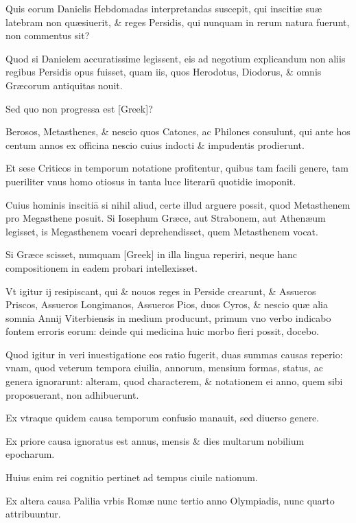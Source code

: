 \begin{parnumbers}

Quis eorum Danielis  Hebdomadas interpretandas suscepit, qui inscitiæ suæ latebram non quæsiuerit, \& reges Persidis, qui nunquam in rerum natura fuerunt, non commentus sit?

Quod si Danielem accuratissime legissent, eis ad negotium explicandum non aliis regibus Persidis opus fuisset, quam iis, quos Herodotus, Diodorus, \& omnis Græcorum antiquitas nouit.

Sed quo non progressa est \textgreek{[Greek]}?

Berosos, Metasthenes, \& nescio quos Catones, ac Philones consulunt, qui ante hos centum annos ex officina nescio cuius indocti \& impudentis prodierunt.

Et sese Criticos in temporum notatione profitentur, quibus tam facili genere, tam pueriliter vnus homo otiosus in tanta luce literarū quotidie imoponit.

 Cuius hominis inscitiā si nihil aliud, certe illud arguere possit, quod Metasthenem pro Megasthene posuit. Si Iosephum Græce, aut Strabonem, aut Athenæum legisset, is Megasthenem vocari deprehendisset, quem Metasthenem vocat.

Si Græce scisset, numquam \textgreek{[Greek]} in illa lingua reperiri, neque hanc compositionem in eadem probari intellexisset.

Vt igitur ij resipiscant, qui \& nouos reges in Perside crearunt, \& Assueros Priscos, Assueros Longimanos, Assueros Pios, duos Cyros, \& nescio quæ alia somnia Annij Viterbiensis in medium producunt, primum vno verbo indicabo fontem erroris eorum: deinde qui medicina huic morbo fieri possit, docebo.

Quod igitur in veri inuestigatione  eos ratio fugerit, duas summas causas reperio: vnam, quod veterum tempora ciuilia, annorum, mensium formas, status, ac genera ignorarunt: alteram, quod characterem, \& notationem ei anno, quem sibi proposuerant, non adhibuerunt.

Ex vtraque quidem causa temporum confusio manauit, sed diuerso genere.

Ex priore causa ignoratus est annus, mensis \& dies multarum nobilium epocharum.

Huius enim rei cognitio pertinet ad tempus ciuile nationum.

Ex altera causa Palilia vrbis Romæ nunc tertio anno Olympiadis, nunc quarto attribuuntur.


\end{parnumbers}
